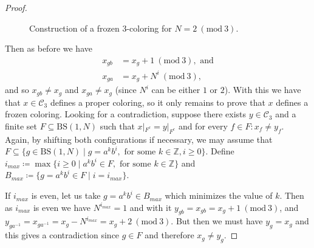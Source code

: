 \documentclass{aims}
\newcommand{\BS}[1][N]{\mathrm{BS}(1,#1)}
\theoremstyle{definition}
\begin{document}
\begin{proof}
\begin{figure}[H]
		\caption{Construction of a frozen $3$-coloring for $N=2\ (\mathrm{mod} \ 3)$.}
		\label{fig:gcs_frozen_3_col_N_2}
	\end{figure}	
	
	Then as before we have
	\begin{align*}
	x_{gb}&=x_g+1 \ (\mathrm{mod} \ 3), \text{ and} \\
	x_{ga}&=x_g+N^i \ (\mathrm{mod} \ 3),
	\end{align*}
	and so $x_{gb}\neq x_g$ and $x_{ga}\neq x_g$ (since $N^i$ can be either $1$ or $2$). With this we have that $x\in \mathcal{C}_3$ defines a proper coloring, so it only remains to prove that $x$ defines a frozen coloring. Looking for a contradiction, suppose there exists $y\in \mathcal{C}_3$ and a finite set $F\subseteq \BS$ such that $x|_{F^c}=y|_{F^c}$ and for every $f\in F: x_f\neq y_f$. Again, by shifting both configurations if necessary, we may assume that $F\subseteq \{g\in \BS\mid g=a^kb^i, \text{ for some }k\in \mathbb{Z}, i\ge 0\}$. Define $i_{max}\coloneqq \max\{ i\ge 0\mid a^kb^i\in F, \text{ for some }k\in \mathbb{Z}\}$ and $B_{max}\coloneqq\{g=a^kb^i\in F\mid i=i_{max}\}$.
	
	If $i_{max}$ is even, let us take $g=a^kb^i\in B_{max}$ which minimizes the value of $k$. Then as $i_{max}$ is even we have $N^{i_{max}}=1$ and with it $y_{gb}=x_{gb}=x_g+1  \ (\mathrm{mod} \ 3)$, and $y_{ga^{-1}}=x_{ga^{-1}}=x_g-N^{i_{max}} = x_g+2  \ (\mathrm{mod} \ 3)$. But then we must have $y_g=x_g$ and this gives a contradiction since $g\in F$ and therefore $x_g\neq y_g$.
	

\end{proof}
\end{document}
